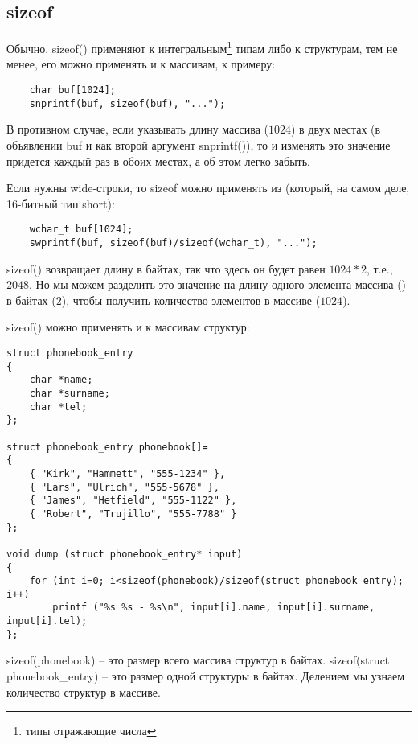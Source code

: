 ﻿\subsection{sizeof}

Обычно, sizeof() применяют к интегральным\footnote{типы отражающие числа} типам либо к структурам, 
тем не менее, его можно применять и к массивам, к примеру:


\begin{lstlisting}
	char buf[1024];
	snprintf(buf, sizeof(buf), "...");
\end{lstlisting}

В противном случае, если указывать длину массива ($1024$) в двух местах (в объявлении buf и как второй 
аргумент snprintf()), то и изменять это значение придется каждый раз в обоих местах, а об этом легко забыть.

Если нужны wide-строки, то sizeof можно применять из  (который, на самом деле, 16-битный тип short):

\begin{lstlisting}
	wchar_t buf[1024];
	swprintf(buf, sizeof(buf)/sizeof(wchar_t), "...");
\end{lstlisting}

sizeof() возвращает длину в байтах, так что здесь он будет равен $1024*2$, т.е., $2048$. Но мы можем
разделить это значение на длину одного элемента массива () в байтах ($2$), 
чтобы получить количество элементов в массиве ($1024$).

sizeof() можно применять и к массивам структур:

\begin{lstlisting}
struct phonebook_entry
{
	char *name;
	char *surname;
	char *tel;
};

struct phonebook_entry phonebook[]=
{
	{ "Kirk", "Hammett", "555-1234" },
	{ "Lars", "Ulrich", "555-5678" },
	{ "James", "Hetfield", "555-1122" },
	{ "Robert", "Trujillo", "555-7788" }
};

void dump (struct phonebook_entry* input)
{
	for (int i=0; i<sizeof(phonebook)/sizeof(struct phonebook_entry); i++)
		printf ("%s %s - %s\n", input[i].name, input[i].surname, input[i].tel);
};
\end{lstlisting}

sizeof(phonebook) -- это размер всего массива структур в байтах. sizeof(struct phonebook\_entry) -- 
это размер одной структуры в байтах.
Делением мы узнаем количество структур в массиве.

